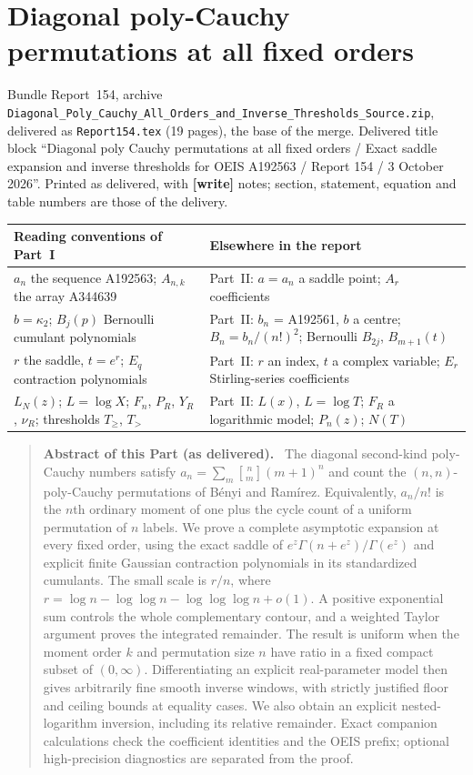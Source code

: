 \documentclass[11pt,letterpaper]{article}
\numberwithin{equation}{section}
\theoremstyle{definition}\newtheorem{definition}[theorem]{Definition}
\theoremstyle{remark}\newtheorem{remark}[theorem]{Remark}
\newcommand{\sone}[2]{\genfrac{[}{]}{0pt}{}{#1}{#2}}
\newcommand{\file}[1]{\nolinkurl{#1}}
\newenvironment{partabstract}{\begin{quote}\small\noindent\textbf{Abstract of this Part (as delivered).}\ }{\end{quote}}
\newcommand{\partsource}[1]{\par\noindent\begin{minipage}{\textwidth}\small #1\end{minipage}\par\medskip}
\begin{document}
\part{Diagonal poly-Cauchy permutations at all fixed orders}\label{sfp:pc:part}
\partsource{Bundle Report~154, archive \file{Diagonal_Poly_Cauchy_All_Orders_and_Inverse_Thresholds_Source.zip}, delivered as \file{Report154.tex} (19 pages), the base of the merge. Delivered title block ``Diagonal poly Cauchy permutations at all fixed orders / Exact saddle expansion and inverse thresholds for OEIS A192563 / Report 154 / 3 October 2026''. Printed as delivered, with \textbf{[write]} notes; section, statement, equation and table numbers are those of the delivery.}
\begin{center}
\small
\begin{tabular}{@{}>{\raggedright\arraybackslash}p{} >{\raggedright\arraybackslash}p{}@{}}
\toprule
Reading conventions of Part~I & Elsewhere in the report\\
\midrule
$a_n$ the sequence A192563; $A_{n,k}$ the array A344639 & Part~II: $a=a_n$ a saddle point; $A_r$ coefficients\\
$b=\kappa_2$; $B_j(p)$ Bernoulli cumulant polynomials & Part~II: $b_n$ = A192561, $b$ a centre; $B_n=b_n/(n!)^2$; Bernoulli $B_{2j}$, $B_{m+1}(t)$\\
$r$ the saddle, $t=e^r$; $E_q$ contraction polynomials & Part~II: $r$ an index, $t$ a complex variable; $E_r$ Stirling-series coefficients\\
$L_N(z)$; $L=\log X$; $F_n$, $P_R$, $Y_R$, $\nu_R$; thresholds $T_\ge$, $T_>$ & Part~II: $L(x)$, $L=\log T$; $F_R$ a logarithmic model; $P_n(z)$; $N(T)$\\
\bottomrule
\end{tabular}
\end{center}
\begin{partabstract}
The diagonal second-kind poly-Cauchy numbers satisfy
$a_n=\sum_m\sone nm(m+1)^n$ and count the $(n,n)$-poly-Cauchy
permutations of B\'enyi and Ram\'irez. Equivalently,
$a_n/n!$ is the $n$th ordinary moment of one plus the cycle count
of a uniform permutation of $n$ labels. We prove a complete
asymptotic expansion at every fixed order, using the exact saddle
of $e^z\Gamma(n+e^z)/\Gamma(e^z)$ and explicit finite Gaussian
contraction polynomials in its standardized cumulants. The small scale is
$r/n$, where
$r=\log n-\log\log n-\log\log\log n+o(1)$.
A positive exponential sum controls the whole complementary
contour, and a weighted Taylor argument proves the integrated
remainder. The result is uniform when the moment order $k$ and
permutation size $n$ have ratio in a fixed compact subset of
$(0,\infty)$. Differentiating an explicit real-parameter model
then gives arbitrarily fine smooth inverse windows, with
strictly justified floor and ceiling bounds at equality cases.
We also obtain an explicit nested-logarithm inversion,
including its relative remainder. Exact companion calculations
check the coefficient identities and the OEIS prefix; optional
high-precision diagnostics are separated from the proof.
\end{partabstract}
\end{document}
